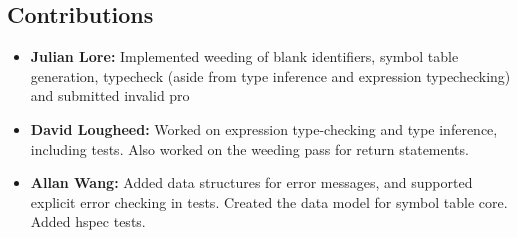 \documentclass[11pt]{article}
\begin{document}
\subsection{Contributions}
\label{sec:org5d49dd8}
\begin{itemize}
\item \textbf{Julian Lore:} Implemented weeding of blank identifiers, symbol
table generation, typecheck (aside from type inference and
expression typechecking) and submitted invalid pro
\item \textbf{David Lougheed:} Worked on expression type-checking and type inference,
including tests. Also worked on the weeding pass for return
statements.
\item \textbf{Allan Wang:} Added data structures for error messages, and supported explicit error checking in tests. Created the data model for symbol table core. Added hspec tests.
\end{itemize}
\end{document}
